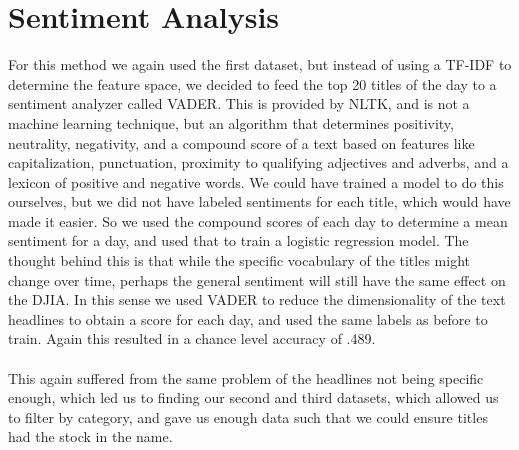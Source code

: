 \documentclass{article}
\begin{document}
\section{Sentiment Analysis}
For this method we again used the first dataset, but instead of using a TF-IDF to determine the feature space, we decided
 to feed the top 20 titles of the day to a sentiment analyzer called VADER. This is provided by NLTK, and is not a machine
 learning technique, but an algorithm that determines positivity, neutrality, negativity, and a compound score of a text
 based on features like capitalization, punctuation, proximity to qualifying adjectives and adverbs, and a lexicon of
 positive and negative words. We could have trained a model to do this ourselves, but we did not have labeled sentiments
 for each title, which would have made it easier. So we used the compound scores of each day to determine a mean
 sentiment for a day, and used that to train a logistic regression model. The thought behind this is that while the specific
 vocabulary of the titles might change over time, perhaps the general sentiment will still have the same effect on the DJIA.
 In this sense we used VADER to reduce the dimensionality of the text headlines to obtain a score for each day, and used the
 same labels as before to train. Again this resulted in a chance level accuracy of .489.
\\\\
This again suffered from the same problem of the headlines not being specific enough, which led us to finding our second
 and third datasets, which allowed us to filter by category, and gave us enough data such that we could ensure titles had
 the stock in the name.
\end{document}
